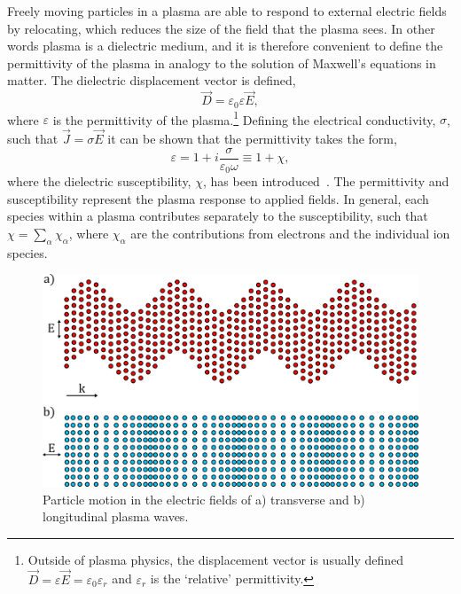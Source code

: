 Freely moving particles in a plasma are able to respond to external electric fields by relocating, which reduces the size of the field that the plasma sees.
In other words plasma is a dielectric medium, and it is therefore convenient to define the permittivity of the plasma in analogy to the solution of Maxwell's equations in matter.
The dielectric displacement vector is defined,
\begin{equation}
    \vec{D} = \varepsilon_0 \varepsilon \vec{E},
\end{equation}
where $\varepsilon$ is the permittivity of the plasma.\footnote{Outside of plasma physics, the displacement vector is usually defined $\vec{D} = \varepsilon\vec{E} = \varepsilon_0 \varepsilon_{r}$ and $\varepsilon_r$ is the `relative' permittivity.}
Defining the electrical conductivity, $\sigma$, such that $\vec{J}=\sigma\vec{E}$ it can be shown that the permittivity takes the form,
\begin{equation}
    \label{eq:theory_perm_def}
    \varepsilon = 1 + i\frac{\sigma}{\varepsilon_0\omega} \equiv 1 + \chi,
\end{equation}
where the dielectric susceptibility, $\chi$, has been introduced~\cite{michel_introduction_2023}.
The permittivity and susceptibility represent the plasma response to applied fields.
In general, each species within a plasma contributes separately to the susceptibility, such that $\chi = \sum\nolimits_\alpha \chi_\alpha$, where $\chi_\alpha$ are the contributions from electrons and the individual ion species.

\begin{figure}[t!]
    \includegraphics[width=0.75\linewidth]{Theory/Images/plasma_waves.png}
    \centering
    \caption{Particle motion in the electric fields of a) transverse and b) longitudinal plasma waves.}%
    \label{fig:theory_plasma_waves}
\end{figure}

